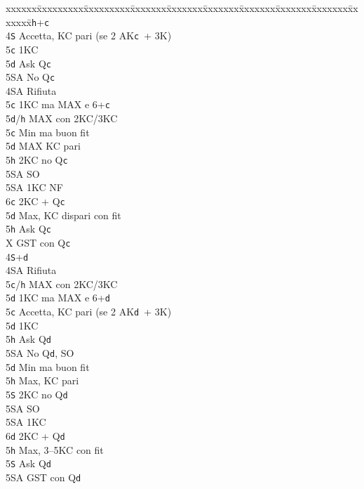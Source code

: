 \documentclass[a4paper,italian]{article}
\newcommand{\BS}{\small{\texttt{S}}}
\newcommand{\BC}{\small{\texttt{c}}}
\newcommand{\BD}{\small{\texttt{d}}}
\newcommand{\BH}{\small{\texttt{h}}}
\newenvironment{bidtable}
{\begin{tabbing}

    xxxxxx\=xxxxxxxxx\=xxxxxxxxx\=xxxxxxx\=xxxxxxx\=xxxxxxx\=xxxxxxx\=xxxxxxx\=xxxxxxx\=xxxxxxx\=\kill}
{\end{tabbing} }%
\newenvironment{sviluppi}
{\begin{tcolorbox}[colframe=azzurro,title=Sviluppi particolari]}
    {
\end{tcolorbox} }%
\begin{document}
\begin{multicols}{2}
\begin{sviluppi}
        \begin{bidtable}
        4\BH {}+\BC\+\\
        4\BS \> Accetta, KC pari (se 2 AK\BC\ + 3K)\+\\
        5\BC \> 1KC\\
        5\BD \> Ask Q\BC\+\\
        5\small{SA}\> No Q\BC\-\-\\
        4\small{SA} \> Rifiuta \+\\
        5\BC \> 1KC ma MAX e 6+\BC\\
        5\BD/\BH \> MAX con 2KC/3KC \-\\
        5\BC \> Min ma buon fit\+\\
        5\BD \> MAX KC pari\+\\
        5\BH \> 2KC no Q\BC\+\\
        5\small{SA} \> SO\-\\
        5\small{SA} \> 1KC NF\\
        6\BC \> 2KC + Q\BC\-\-\\
        5\BD \> Max, KC dispari con fit\+\\
        5\BH \> Ask Q\BC\\
        X \> GST con Q\BC\-\-\\
        4\BS {}+\BD\+\\
        4\small{SA} \> Rifiuta \+\\
        5\BC/\BH \> MAX con 2KC/3KC\\
        5\BD \> 1KC ma MAX e 6+\BD\-\\
        5\BC \> Accetta, KC pari (se 2 AK\BD\ + 3K)\+\\
        5\BD \> 1KC \\
        5\BH \> Ask Q\BD\+\\
        5\small{SA} \> No Q\BD, SO\-\-\\
        5\BD \> Min ma buon fit\+\\
        5\BH \> Max, KC pari \+\\
        5\BS \> 2KC no Q\BD\+\\
        5\small{SA} \> SO\-\\
        5\small{SA} \> 1KC \\
        6\BD \> 2KC + Q\BD\-\-\\
        5\BH \> Max, 3--5KC con fit\+\\
        5\BS \> Ask Q\BD\\
        5\small{SA} \> GST con Q\BD
        \end{bidtable}
    \end{sviluppi}
    \vfill\null
    \columnbreak


\end{multicols}
\end{document}
